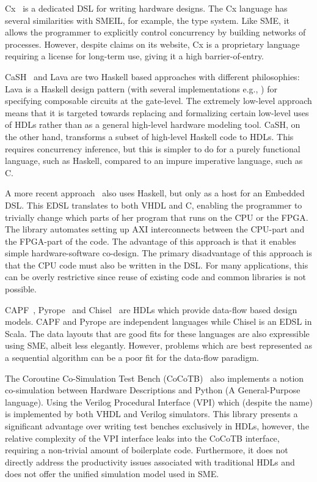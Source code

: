 Cx~\cite{cxlang} is a dedicated DSL for writing hardware designs. The Cx
language has several similarities with SMEIL, for example, the type system. Like
SME, it allows the programmer to explicitly control concurrency by building
networks of processes. However, despite claims on its website, Cx is a
proprietary language requiring a license for long-term use, giving it a high
barrier-of-entry.

C\textlambda{}aSH~\cite{wester2015transformation} and Lava\cite{bjesse1998lava}
are two Haskell based approaches with different philosophies: Lava is a Haskell
design pattern (with several implementations e.g., \cite{gill2009introducing})
for specifying composable circuits at the gate-level. The extremely low-level
approach means that it is targeted towards replacing and formalizing certain
low-level uses of HDLs rather than as a general high-level hardware modeling
tool. C\textlambda{}aSH, on the other hand, transforms a subset of high-level
Haskell code to HDLs. This requires concurrency inference, but this is simpler
to do for a purely functional language, such as Haskell, compared to an impure
imperative language, such as C.

A more recent approach~\cite{aronsson2017hardware} also uses Haskell, but only
as a host for an Embedded DSL. This EDSL translates to both VHDL and C, enabling
the programmer to trivially change which parts of her program that runs on the
CPU or the FPGA. The library automates setting up AXI interconnects between the
CPU-part and the FPGA-part of the code. The advantage of this approach is that
it enables simple hardware-software co-design. The primary disadvantage of this
approach is that the CPU code must also be written in the DSL. For many
applications, this can be overly restrictive since reuse of existing code and
common libraries is not possible.

CAPF~\cite{serot2011implementing}, Pyrope~\cite{pyrope} and
Chisel~\cite{bachrach2012chisel} are HDLs which provide data-flow based design
models. CAPF and Pyrope are independent languages while Chisel is an EDSL in
Scala. The data layouts that are good fits for these languages are also
expressible using SME, albeit less elegantly. However, problems which are best
represented as a sequential algorithm can be a poor fit for the data-flow
paradigm.

The Coroutine Co-Simulation Test Bench (CoCoTB)~\cite{cocotb} also implements a
notion co-simulation between Hardware Descriptions and Python (A General-Purpose
language). Using the Verilog Procedural Interface (VPI) which (despite the name)
is implemented by both VHDL and Verilog simulators. This library presents a
significant advantage over writing test benches exclusively in HDLs, however,
the relative complexity of the VPI interface leaks into the CoCoTB interface,
requiring a non-trivial amount of boilerplate code. Furthermore, it does not
directly address the productivity issues associated with traditional HDLs and
does not offer the unified simulation model used in SME.


